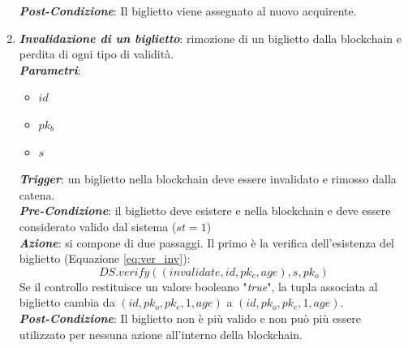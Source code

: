 \begin{enumerate}
\textbf{\textit{Post-Condizione}}: Il biglietto viene assegnato al nuovo acquirente. 
\item \textbf{\textit{Invalidazione di un biglietto}}: rimozione di un biglietto dalla blockchain e perdita di ogni tipo di validità. \\
\textbf{\textit{Parametri}}:
\begin{itemize}
\item $id$
\item $pk_{b}$
\item $ s $ 
\end{itemize}
\textbf{\textit{Trigger}}: un biglietto nella blockchain deve essere invalidato e rimosso dalla catena. \\
\textbf{\textit{Pre-Condizione}}: il biglietto deve esistere e nella blockchain e deve essere considerato valido dal sistema ($st = 1$) \\
\textbf{\textit{Azione}}: si compone di due passaggi. Il primo è la verifica dell'esistenza del biglietto (Equazione \ref{eq:ver_inv}): 
\begin{equation} \label{eq:ver_inv}
DS.verify((invalidate, id, pk_{c}, age), s, pk_{o})
\end{equation}
Se il controllo restituisce un valore booleano "\textit{true}", la tupla associata al biglietto cambia da $(id, pk_{o}, pk_{c}, 1, age)$ a $(id, pk_{o}, pk_{c}, 1, age)$. \\
\textbf{\textit{Post-Condizione}}: Il biglietto non è più valido e non può più essere utilizzato per nessuna azione all'interno della blockchain. 
\end{enumerate}
